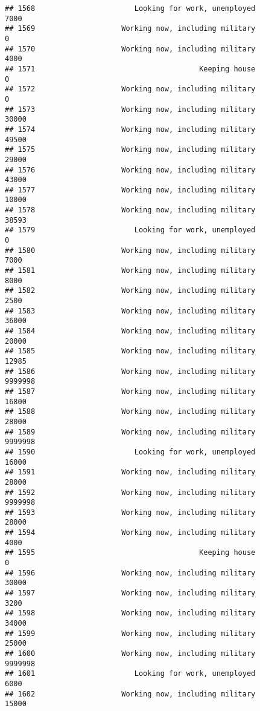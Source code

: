 \documentclass[]{book}
\theoremstyle{definition}
\theoremstyle{definition}
\theoremstyle{remark}
\begin{document}
\begin{verbatim}
## 1568                       Looking for work, unemployed            7000
## 1569                    Working now, including military               0
## 1570                    Working now, including military            4000
## 1571                                      Keeping house               0
## 1572                    Working now, including military               0
## 1573                    Working now, including military           30000
## 1574                    Working now, including military           49500
## 1575                    Working now, including military           29000
## 1576                    Working now, including military           43000
## 1577                    Working now, including military           10000
## 1578                    Working now, including military           38593
## 1579                       Looking for work, unemployed               0
## 1580                    Working now, including military            7000
## 1581                    Working now, including military            8000
## 1582                    Working now, including military            2500
## 1583                    Working now, including military           36000
## 1584                    Working now, including military           20000
## 1585                    Working now, including military           12985
## 1586                    Working now, including military         9999998
## 1587                    Working now, including military           16800
## 1588                    Working now, including military           28000
## 1589                    Working now, including military         9999998
## 1590                       Looking for work, unemployed           16000
## 1591                    Working now, including military           28000
## 1592                    Working now, including military         9999998
## 1593                    Working now, including military           28000
## 1594                    Working now, including military            4000
## 1595                                      Keeping house               0
## 1596                    Working now, including military           30000
## 1597                    Working now, including military            3200
## 1598                    Working now, including military           34000
## 1599                    Working now, including military           25000
## 1600                    Working now, including military         9999998
## 1601                       Looking for work, unemployed            6000
## 1602                    Working now, including military           15000

\end{verbatim}
\end{document}
